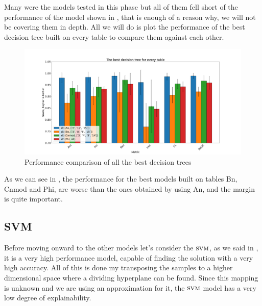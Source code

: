 Many were the models tested in this phase but all of them fell short of the performance of the model
shown in , that is enough of a reason why, we will not be covering them
in depth. All we will do is plot the performance of the best decision tree built on every table to
compare them against each other.
\begin{figure}[h!]
	\centering
	\includegraphics[width=\linewidth]{img/best_dts.png}
	\caption{Performance comparison of all the best decision trees} \label{fig:best-dts}
\end{figure}

As we can see in , the performance for the best models built on tables Bn, Cnmod
and Phi, are worse than the ones obtained by using An, and the margin is quite important.
\subsection{SVM}
Before moving onward to the other models let's consider the $\textsc{svm}$, as we said in , it
is a very high performance model, capable of finding the solution with a very high accuracy. All of
this is done my transposing the samples to a higher dimensional space where a dividing hyperplane
can be found. Since this mapping is unknown and we are using an approximation for it, the $\textsc{svm}$
model has a very low degree of explainability.


